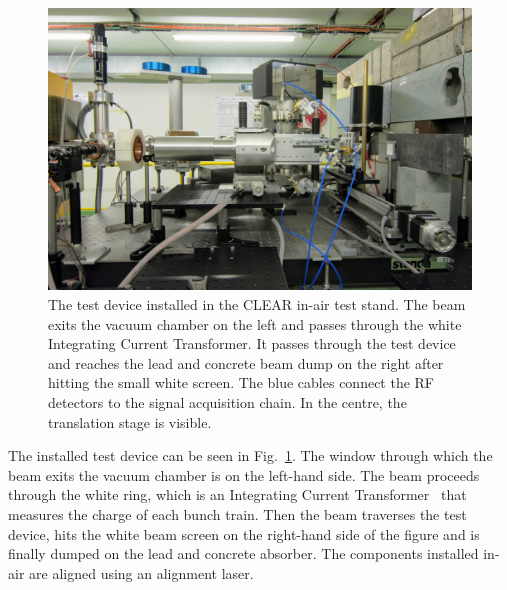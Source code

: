 \begin{figure}[t]
\centering
\includegraphics[width=13cm, keepaspectratio]{pictures/clear_installation}
\caption{The test device installed in the CLEAR in-air test stand. The beam exits the vacuum chamber on the left and passes through the white Integrating Current Transformer. It passes through the test device and reaches the lead and concrete beam dump on the right after hitting the small white screen. The blue cables connect the RF detectors to the signal acquisition chain. In the centre, the translation stage is visible.}
\label{fig:clear_installation}






\end{figure}




The installed test device can be seen in Fig.~\ref{fig:clear_installation}. The window through which the beam exits the vacuum chamber is on the left-hand side. The beam proceeds through the white ring, which is an Integrating Current Transformer~\cite{Clear:ICT} that measures the charge of each bunch train. Then the beam traverses the test device, hits the white beam screen on the right-hand side of the figure and is finally dumped on the lead and concrete absorber. The components installed in-air are aligned using an alignment laser.

